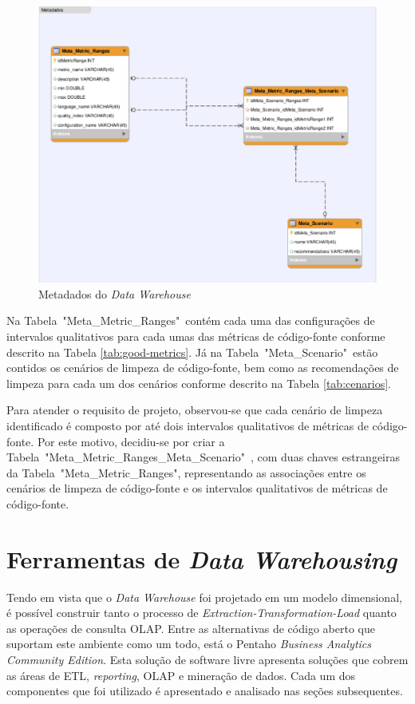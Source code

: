 \begin{figure}[ht!]
\centering
\includegraphics[keepaspectratio=false,scale=0.5]{figuras/metadados.eps}
\caption{Metadados do \textit{Data Warehouse}}
\label{fig:metadados}
\end{figure}
\FloatBarrier


Na Tabela~"Meta\_Metric\_Ranges"~contém cada uma das configurações de intervalos qualitativos para cada umas das métricas de código-fonte conforme descrito na Tabela \ref{tab:good-metrics}. Já na Tabela~"Meta\_Scenario"~estão contidos os cenários de limpeza de código-fonte, bem como as recomendações de limpeza para cada um dos cenários conforme descrito na Tabela \ref{tab:cenarios}. 


Para atender o requisito de projeto, observou-se que cada cenário de limpeza identificado é composto por até dois intervalos qualitativos de métricas de código-fonte. Por este motivo, decidiu-se por criar a Tabela~"Meta\_Metric\_Ranges\_Meta\_Scenario"~, com duas chaves estrangeiras da Tabela~"Meta\_Metric\_Ranges", representando as associações entre os cenários de limpeza de código-fonte e os intervalos qualitativos de métricas de código-fonte.



\section{Ferramentas de \textit{Data Warehousing}}

Tendo em vista que o \textit{Data Warehouse} foi projetado em um modelo dimensional, é possível construir tanto o processo de \textit{Extraction-Transformation-Load} quanto as operações de consulta OLAP. Entre as alternativas de código aberto que suportam este ambiente como um todo, está o Pentaho \textit{Business Analytics Community Edition}. Esta solução de software livre apresenta soluções que cobrem 
as áreas de ETL, \textit{reporting}, OLAP e mineração de dados. Cada um dos componentes que foi utilizado é apresentado e analisado nas seções subsequentes.
 


